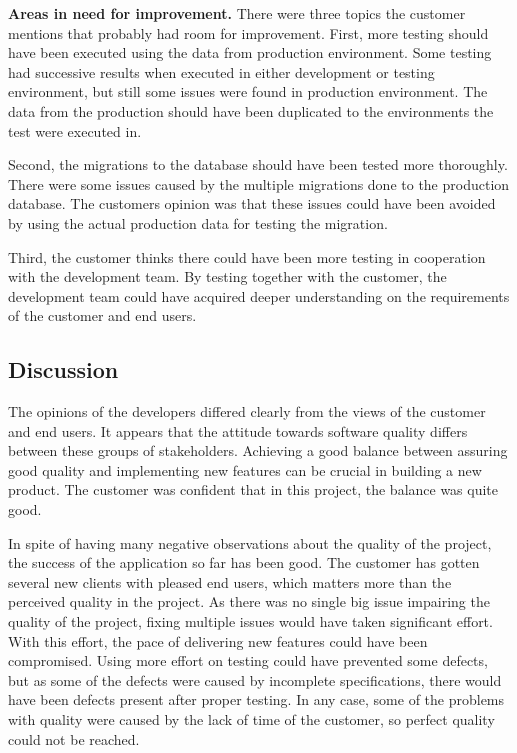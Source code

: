 \textbf{Areas in need for improvement.} There were three topics the customer mentions that probably had room for improvement. First, more testing should have been executed using the data from production environment. Some testing had successive results when executed in either development or testing environment, but still some issues were found in production environment. The data from the production should have been duplicated to the environments the test were executed in.

Second, the migrations to the database should have been tested more thoroughly. There were some issues caused by the multiple migrations done to the production database. The customers opinion was that these issues could have been avoided by using the actual production data for testing the migration.

Third, the customer thinks there could have been more testing in cooperation with the development team. By testing together with the customer, the development team could have acquired deeper understanding on the requirements of the customer and end users.


\subsection{Discussion}


The opinions of the developers differed clearly from the views of the customer and end users. It appears that the attitude towards software quality differs between these groups of stakeholders. Achieving a good balance between assuring good quality and implementing new features can be crucial in building a new product. The customer was confident that in this project, the balance was quite good. 

In spite of having many negative observations about the quality of the project, the success of the application so far has been good. The customer has gotten several new clients with pleased end users, which matters more than the perceived quality in the project. As there was no single big issue impairing the quality of the project, fixing multiple issues would have taken significant effort. With this effort, the pace of delivering new features could have been compromised. Using more effort on testing could have prevented some defects, but as some of the defects were caused by incomplete specifications, there would have been defects present after proper testing. In any case, some of the problems with quality were caused by the lack of time of the customer, so perfect quality could not be reached.

